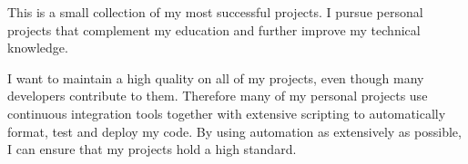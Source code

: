 
This is a small collection of my most successful projects. I pursue personal projects that complement my education and further improve my technical knowledge.

\hfill\break

I want to maintain a high quality on all of my projects, even though many developers contribute to them. Therefore many of my personal projects use continuous integration tools together with extensive scripting to automatically format, test and deploy my code. By using automation as extensively as possible, I can ensure that my projects hold a high standard.